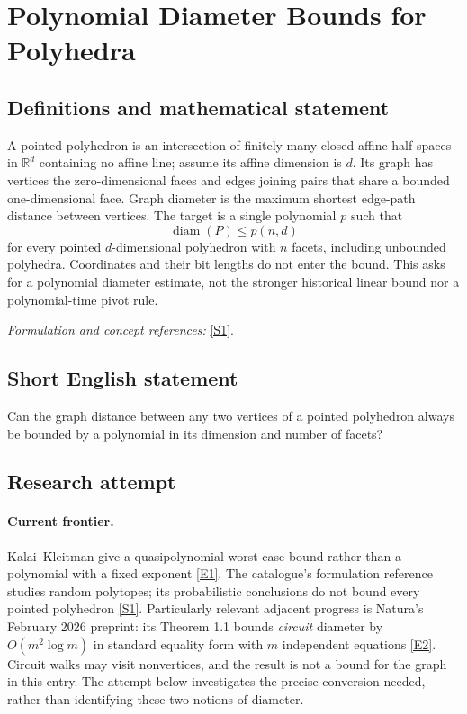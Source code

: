 \documentclass[11pt,a4paper]{article}
\newcommand{\R}{\mathbb{R}}
\newcommand{\sref}[2]{\hyperlink{source:#1:#2}{[S#2]}}
\newcommand{\eref}[2]{\hyperlink{extra:#1:#2}{[E#2]}}
\newif\ifshowcatalogue
\newcommand{\cataloguescope}[1]{\ifshowcatalogue
 \paragraph{Exact scope in the supplied catalogue.}
 \begin{quote}\small #1\end{quote}\fi}
\begin{document}
\setcounter{section}{0}
\clearpage
\section*{\texorpdfstring{Polynomial Diameter Bounds for Polyhedra}{Polynomial Diameter Bounds for Polyhedra}}\label{statement}
\subsection{Definitions and mathematical statement}
A pointed polyhedron is an intersection of finitely many closed affine half-spaces in $\R^d$ containing no affine line; assume its affine dimension is $d$. Its graph has vertices the zero-dimensional faces and edges joining pairs that share a bounded one-dimensional face. Graph diameter is the maximum shortest edge-path distance between vertices. The target is a single polynomial $p$ such that
\[
 \operatorname{diam}(P)\le p(n,d)
\]
for every pointed $d$-dimensional polyhedron with $n$ facets, including unbounded polyhedra. Coordinates and their bit lengths do not enter the bound. This asks for a polynomial diameter estimate, not the stronger historical linear bound nor a polynomial-time pivot rule.
\par\smallskip\textit{Formulation and concept references:} \sref{statement}{1}.
\cataloguescope{Prove or disprove that there is a polynomial p such that the vertex-edge graph of every pointed d-dimensional polyhedron, bounded or unbounded, with n facets has diameter at most p(n,d).}
\subsection{Short English statement}
Can the graph distance between any two vertices of a pointed polyhedron always be bounded by a polynomial in its dimension and number of facets?
\subsection{Research attempt}

\paragraph{Current frontier.}
Kalai--Kleitman give a quasipolynomial worst-case bound rather than a
polynomial with a fixed exponent \eref{statement}{1}. The catalogue's formulation
reference studies random polytopes; its probabilistic conclusions do not
bound every pointed polyhedron \sref{statement}{1}. Particularly relevant adjacent
progress is Natura's February 2026 preprint: its Theorem 1.1 bounds
\emph{circuit} diameter by $O(m^2\log m)$ in standard equality form with
$m$ independent equations \eref{statement}{2}. Circuit walks may visit nonvertices,
and the result is not a bound for the graph in this entry. The attempt below
investigates the precise conversion needed, rather than identifying these
two notions of diameter.
\end{document}
